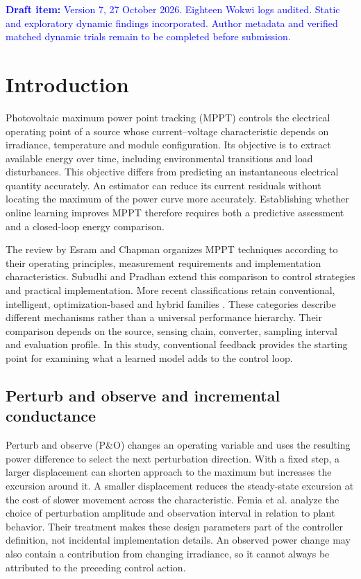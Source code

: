 \documentclass[Acad.Energy.,researcharticle,9pt,twoside,oneauthor]{Definitions/jams_academia}
\newcommand{\pending}[1]{\par\smallskip\noindent\textcolor{blue}{\textbf{Draft item:} #1}\par\smallskip}
\begin{document}
\pending{Version 7, 27 October 2026. Eighteen Wokwi logs audited. Static and exploratory dynamic findings incorporated. Author metadata and verified matched dynamic trials remain to be completed before submission.}
\section{Introduction}
Photovoltaic maximum power point tracking (MPPT) controls the electrical operating point of a source whose current--voltage characteristic depends on irradiance, temperature and module configuration. Its objective is to extract available energy over time, including environmental transitions and load disturbances. This objective differs from predicting an instantaneous electrical quantity accurately. An estimator can reduce its current residuals without locating the maximum of the power curve more accurately. Establishing whether online learning improves MPPT therefore requires both a predictive assessment and a closed-loop energy comparison.

The review by Esram and Chapman \cite{esram} organizes MPPT techniques according to their operating principles, measurement requirements and implementation characteristics. Subudhi and Pradhan \cite{subudhi} extend this comparison to control strategies and practical implementation. More recent classifications retain conventional, intelligent, optimization-based and hybrid families \cite{review2023}. These categories describe different mechanisms rather than a universal performance hierarchy. Their comparison depends on the source, sensing chain, converter, sampling interval and evaluation profile. In this study, conventional feedback provides the starting point for examining what a learned model adds to the control loop.

\subsection{Perturb and observe and incremental conductance}
Perturb and observe (P\&O) changes an operating variable and uses the resulting power difference to select the next perturbation direction. With a fixed step, a larger displacement can shorten approach to the maximum but increases the excursion around it. A smaller displacement reduces the steady-state excursion at the cost of slower movement across the characteristic. Femia et al. \cite{femia} analyze the choice of perturbation amplitude and observation interval in relation to plant behavior. Their treatment makes these design parameters part of the controller definition, not incidental implementation details. An observed power change may also contain a contribution from changing irradiance, so it cannot always be attributed to the preceding control action.
\end{document}
